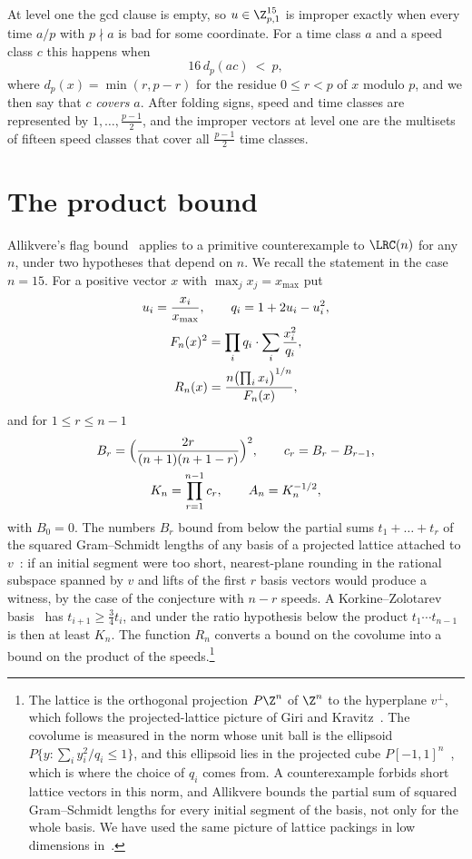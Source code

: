 At level one the gcd clause is empty, so $u\in\Z_{p,1}^{15}$ is improper
exactly when every time $a/p$ with $p\nmid a$ is bad for some coordinate. For
a time class $a$ and a speed class $c$ this happens when
\begin{equation}\label{eq:cover}
 16\,d_p(ac)\ <\ p,
\end{equation}
where $d_p(x)=\min(r,p-r)$ for the residue $0\le r<p$ of $x$ modulo $p$,
and we then say that $c$ \emph{covers} $a$. After folding signs, speed and
time classes are represented by $1,\dots,\frac{p-1}2$, and the improper
vectors at level one are the multisets of fifteen speed classes that cover
all $\frac{p-1}2$ time classes.

\section{The product bound}\label{sec:shape}

Allikvere's flag bound~\cite[Theorem~3.8]{All26} applies to a primitive
counterexample to $\LRC(n)$ for any $n$, under two hypotheses that depend on
$n$. We recall the statement in the case $n=15$. For a positive vector
$x$ with $\max_jx_j=x_{\max}$ put
\begin{gather}
 u_i=\frac{x_i}{x_{\max}},\qquad q_i=1+2u_i-u_i^2,\notag\\
 F_n(x)^2=\prod_iq_i\cdot\sum_i\frac{x_i^2}{q_i},\notag\\
 R_n(x)=\frac{n\bigl(\prod_ix_i\bigr)^{1/n}}{F_n(x)},\label{eq:R}
\end{gather}
and for $1\le r\le n-1$
\begin{gather*}
 B_r=\Bigl(\frac{2r}{(n+1)(n+1-r)}\Bigr)^2,\qquad c_r=B_r-B_{r-1},\\
 K_n=\prod_{r=1}^{n-1}c_r,\qquad A_n=K_n^{-1/2},
\end{gather*}
with $B_0=0$. The numbers $B_r$ bound from below the partial sums
$t_1+\dots+t_r$ of the squared Gram--Schmidt lengths of any basis of a
projected lattice attached to $v$~\cite[Proposition~3.4]{All26}: if an
initial segment were too short, nearest-plane rounding in the rational
subspace spanned by $v$ and lifts of the first $r$ basis vectors would
produce a witness, by the case of the conjecture with $n-r$ speeds. A
Korkine--Zolotarev basis~\cite{KZ1873,LLS90} has $t_{i+1}\ge\frac34t_i$,
and under the ratio hypothesis below the product $t_1\cdots t_{n-1}$ is
then at least $K_n$. The function $R_n$
converts a bound on the covolume into a bound on the product of the
speeds.\footnote{The lattice is the orthogonal projection $P\Z^n$ of
$\Z^n$ to the hyperplane $v^\perp$, which follows the projected-lattice
picture of Giri and Kravitz~\cite{GK26}. The covolume is measured in the
norm whose unit ball is the ellipsoid $P\{y:\sum_iy_i^2/q_i\le1\}$, and
this ellipsoid lies in the projected cube $P[-1,1]^n$~\cite[Lemma~3.1]{All26},
which is where the choice of $q_i$ comes from. A counterexample forbids
short lattice vectors in this norm, and Allikvere bounds the partial sum
of squared Gram--Schmidt lengths for every initial segment of the basis,
not only for the whole basis. We have used the same picture of
lattice packings in low dimensions
in~\cite{BBB26a,BBB26b}.}

